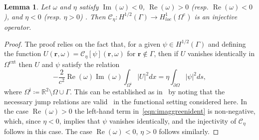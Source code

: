 \documentclass[11pt]{article}
\theoremstyle{plain}
\newtheorem{lemma}{Lemma}
\theoremstyle{remark}
\def \R{\mathbb{R}}
\def \br{\mathbf{r}}
\renewcommand{\Re}{\operatorname{Re}}
\renewcommand{\Im}{\operatorname{Im}}
\begin{document}
\begin{lemma}\label{lem:Injectivty}
  Let $\omega$ and $\eta$ satisfy $\Im(\omega) < 0$, $\Re(\omega) > 0$
  (resp. $\Re(\omega) < 0$), and $\eta < 0$ (resp. $\eta > 0$)
  . Then $\mathcal{C}_\eta : H^{1/2}(\Gamma) \to H^1_{loc}(\Omega^e)$
  is an injective operator.
\end{lemma}
\begin{proof}
  The proof relies on the fact that, for a given $\psi \in H^{1/2}(\Gamma)$
  and defining the function
  $U(\br,\omega)= \mathcal{C}_\eta[\psi](\br,\omega)$ for
  $\mathbf{r}\not\in\Gamma$, then if $U$ vanishes identically in
  $\Omega^\mathrm{ext}$ then $U$ and $\psi$ satisfy the relation
      \begin{equation}\label{eqn:imaggreenident}
        -\frac{2}{c^2}\Re(\omega)\Im(\omega)\int_{\Omega^\mathrm{i}} |U|^2dx = \eta \int_{\partial \Omega}|\psi|^2ds,
    \end{equation}
    where
    $\Omega^{\mathrm{i}} \coloneqq \R^2 \setminus \Omega \cup
    \Gamma$. This can be established as in~\cite[Theorem
    3.33]{COLTON:1983} by noting that the necessary jump relations are
    valid~\cite[Theorem 6.11]{mclean2000strongly} in the functional
    setting considered here.  In the case $\Re(\omega) > 0$ the
    left-hand term in~\eqref{eqn:imaggreenident} is non-negative,
    which, since $\eta < 0$, implies that $\psi$ vanishes identically,
    and the injectivity of $\mathcal{C}_\eta$ follows in this
    case. The case $\Re(\omega) < 0$, $\eta > 0$ follows similarly.
\end{proof}
\end{document}
